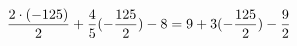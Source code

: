 \documentclass[preview]{standalone}
\begin{document}
\begin{align*}
\special{dvisvgm:raw <g id='unique000'>}\frac{2 \cdot (-125)}{2} + \frac{4}{5} (- \frac{125}{2}) - 8 = 9 + 3(- \frac{125}{2}) - \frac{9}{2}\special{dvisvgm:raw </g>}
\end{align*}
\end{document}
